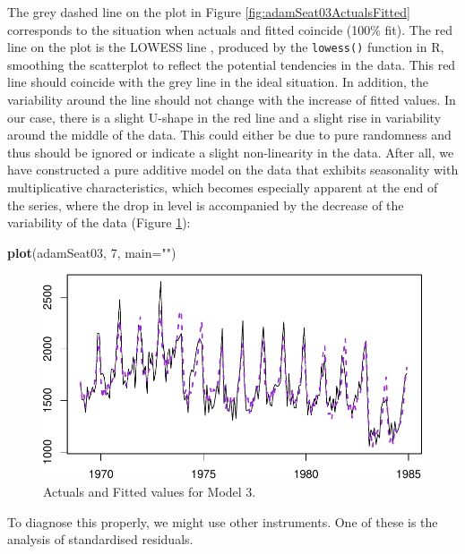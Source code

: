 \documentclass[]{book}
\newenvironment{Shaded}{\begin{snugshade}}{\end{snugshade}}
\newcommand{\DataTypeTok}[1]{\textcolor[rgb]{0.13,0.29,0.53}{#1}}
\newcommand{\DecValTok}[1]{\textcolor[rgb]{0.00,0.00,0.81}{#1}}
\newcommand{\KeywordTok}[1]{\textcolor[rgb]{0.13,0.29,0.53}{\textbf{#1}}}
\newcommand{\NormalTok}[1]{#1}
\newcommand{\StringTok}[1]{\textcolor[rgb]{0.31,0.60,0.02}{#1}}
\theoremstyle{definition}
\theoremstyle{definition}
\theoremstyle{definition}
\theoremstyle{definition}
\theoremstyle{remark}
\begin{document}
The grey dashed line on the plot in Figure \ref{fig:adamSeat03ActualsFitted} corresponds to the situation when actuals and fitted coincide (100\% fit). The red line on the plot is the LOWESS line \citep{Cleveland1979}, produced by the \texttt{lowess()} function in R, smoothing the scatterplot to reflect the potential tendencies in the data. This red line should coincide with the grey line in the ideal situation. In addition, the variability around the line should not change with the increase of fitted values. In our case, there is a slight U-shape in the red line and a slight rise in variability around the middle of the data. This could either be due to pure randomness and thus should be ignored or indicate a slight non-linearity in the data. After all, we have constructed a pure additive model on the data that exhibits seasonality with multiplicative characteristics, which becomes especially apparent at the end of the series, where the drop in level is accompanied by the decrease of the variability of the data (Figure \ref{fig:adamSeat03LinearPlot}):

\begin{Shaded}
\begin{Highlighting}[]
\KeywordTok{plot}\NormalTok{(adamSeat03, }\DecValTok{7}\NormalTok{, }\DataTypeTok{main=}\StringTok{""}\NormalTok{)}
\end{Highlighting}
\end{Shaded}

\begin{figure}
\centering
\includegraphics{Svetunkov--2022----ADAM_files/figure-latex/adamSeat03LinearPlot-1.pdf}
\caption{\label{fig:adamSeat03LinearPlot}Actuals and Fitted values for Model 3.}
\end{figure}

To diagnose this properly, we might use other instruments. One of these is the analysis of standardised residuals.
\end{document}
